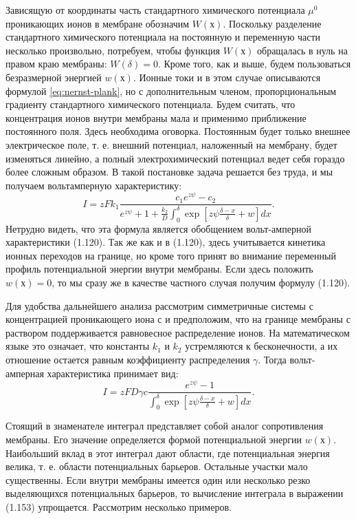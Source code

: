 Зависящую от координаты часть стандартного химического потенциала \(\mu^0\)
проникающих ионов в мембране обозначим \(W(х)\). Поскольку разделение
стандартного химического потенциала на постоянную и переменную части несколько
произвольно, потребуем, чтобы функция \(W(х)\) обращалась в нуль на правом краю
мембраны: \(W(\delta) = 0\). Кроме того, как и выше, будем пользоваться
безразмерной энергией \(w(х)\). Ионные токи и в этом случае описываются формулой
\eqref{eq:nernst-plank}, но с дополнительным членом, пропорциональным градиенту
стандартного химического потенциала. Будем считать, что концентрация ионов
внутри мембраны мала и применимо приближение постоянного поля. Здесь необходима
оговорка. Постоянным будет только внешнее электрическое поле, т. е. внешний
потенциал, наложенный на мембрану, будет изменяться линейно, а полный
электрохимический потенциал ведет себя гораздо более сложным образом.
В такой постановке задача решается без труда, и мы получаем вольтамперную
характеристику:
\begin{equation}
    I = zFk_1 \frac{c_1e^{z\psi}-c_2}{e^{z\psi} + 1 + \frac{k_2}{D}
    \int_0^\delta\exp\left[z\psi\frac{\delta-x}{\delta} + w\right] dx}.
\end{equation}
Нетрудно видеть, что эта формула является обобщением вольт-амперной
характеристики (1.120). Так же как и в (1.120), здесь учитывается кинетика
ионных переходов на границе, но кроме того принят во внимание переменный профиль
потенциальной энергии внутри мембраны. Если здесь положить \(w(х) = 0\), то мы
сразу же в качестве частного случая получим формулу (1.120).

Для удобства дальнейшего анализа рассмотрим симметричные системы с концентрацией
проникающего иона с и предположим, что на границе мембраны с раствором
поддерживается равновесное распределение ионов. На математическом языке это
означает, что константы \( k_1 \) и \( k_2 \) устремляются к бесконечности, а их
отношение остается равным коэффициенту распределения \( \gamma \). Тогда
вольт-амперная характеристика принимает вид:
\begin{equation}
    I = zFD\gamma c \frac{e^{z\psi}-1}
    {\int_0^\delta\exp\left[z\psi\frac{\delta-x}{\delta} + w\right] dx}.
\end{equation}

Стоящий в знаменателе интеграл представляет собой аналог сопротивления мембраны.
Его значение определяется формой потенциальной энергии \( w(х) \). Наибольший
вклад в этот интеграл дают области, где потенциальная энергия велика, т. е.
области потенциальных барьеров. Остальные участки мало существенны. Если внутри
мембраны имеется один или несколько резко выделяющихся потенциальных барьеров,
то вычисление интеграла в выражении (1.153) упрощается. Рассмотрим несколько
примеров.


